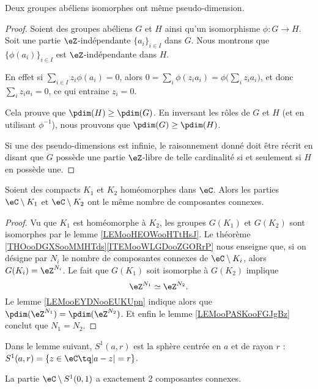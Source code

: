 \begin{lemma}		\label{LEMooEYDNooEUKUpn}
	Deux groupes abéliens isomorphes ont même pseudo-dimension.
\end{lemma}

\begin{proof}
	Soient des groupes abéliens \( G\) et \( H\) ainsi qu'un isomorphisme \(\phi \colon G\to H  \). Soit une partie \( \eZ\)-indépendante \( \{ a_i \}_{i\in I}\) dans \( G\). Nous montrons que \( \{ \phi(a_i) \}_{i\in I}\) est \( \eZ\)-indépendante dans \( H\).

	En effet si \( \sum_{i\in I}z_i\phi(a_i)=0\), alors \( 0=\sum_i\phi(z_ia_i)=\phi\big( \sum_iz_ia_i \big)\), et donc \( \sum_iz_ia_i=0\), ce qui entraine \( z_i=0\).

	Cela prouve que \( \pdim(H)\geq\pdim(G)\). En inversant les rôles de \( G\) et \( H\) (et en utilisant \( \phi^{-1}\)), nous prouvons que \( \pdim(G)\geq \pdim(H)\).

	Si une des pseudo-dimensions est infinie, le raisonnement donné doit être récrit en disant que \( G\) possède une partie \( \eZ\)-libre de telle cardinalité si et seulement si \( H\) en possède une.
\end{proof}

\begin{corollary}		\label{CORooQNUIooKLtWVD}
	Soient des compacts \( K_1\) et \( K_2\) homéomorphes dans \( \eC\). Alors les parties \( \eC\setminus K_1\) et \( \eC\setminus K_2\) ont le même nombre de composantes connexes.
\end{corollary}

\begin{proof}
	Vu que \( K_1\) est homéomorphe à \( K_2\), les groupes \( G(K_1)\) et \( G(K_2)\) sont isomorphes par le lemme \ref{LEMooHEOWooHTtHsJ}. Le théorème \ref{THOooDGXSooMMHTds}\ref{ITEMooWLGDooZGORrP} nous enseigne que, si on désigne par \( N_i\) le nombre de composantes connexes de \( \eC\setminus K_i\), alors \( G(K_i)=\eZ^{N_i}\). Le fait que \( G(K_1)\) soit isomorphe à \( G(K_2)\) implique
	\begin{equation}
		\eZ^{N_1}\simeq \eZ^{N_2}.
	\end{equation}
	Le lemme \ref{LEMooEYDNooEUKUpn} indique alors que \( \pdim(\eZ^{N_1})=\pdim(\eZ^{N_2})\). Et enfin le lemme \ref{LEMooPASKooFGJgBz} conclut que \( N_1=N_2\).
\end{proof}

Dans le lemme suivant, \( S^1(a,r)\) est la sphère centrée en \( a\) et de rayon \( r\) : \( S^1(a,r)=\{ z\in \eC\tq | a-z |=r \}\).
\begin{lemma}		\label{LEMooUSJZooFVAlTa}
	La partie \( \eC\setminus S^1(0,1)\) a exactement 2 composantes connexes.
\end{lemma}

